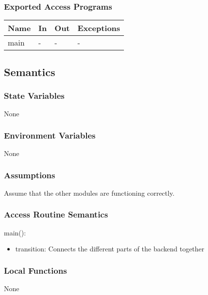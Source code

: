 \documentclass[12pt, titlepage]{article}
\begin{document}
\subsubsection{Exported Access Programs}

\begin{center}
\begin{tabular}{p{2cm} p{4cm} p{4cm} p{2cm}}
\hline
\textbf{Name} & \textbf{In} & \textbf{Out} & \textbf{Exceptions} \\
\hline
main & - & - & - \\
\hline
\end{tabular}
\end{center}

\subsection{Semantics}

\subsubsection{State Variables}

None

\subsubsection{Environment Variables}

None

\subsubsection{Assumptions}
Assume that the other modules are functioning correctly.

\subsubsection{Access Routine Semantics}

\noindent main():
\begin{itemize}
\item transition: Connects the different parts of the backend together
\end{itemize}

\subsubsection{Local Functions}

None

\newpage
\end{document}
